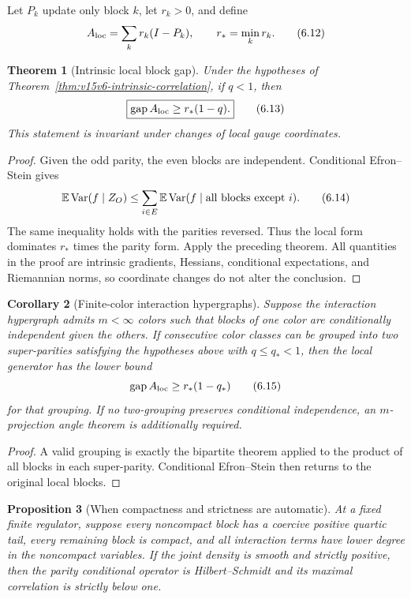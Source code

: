 \documentclass[11pt]{article}
\newtheorem{theorem}{Theorem}[section]
\newtheorem{proposition}[theorem]{Proposition}
\newtheorem{corollary}[theorem]{Corollary}
\theoremstyle{remark}
\begin{document}
Let \(P_k\) update only block \(k\), let \(r_k>0\), and define
\[
 A_{\rm loc}=\sum_kr_k(I-P_k),\qquad r_*=\min_kr_k.            \tag{6.12}
\]

\begin{theorem}[Intrinsic local block gap]
\label{thm:v15v6-local-block-gap}
Under the hypotheses of
Theorem~\ref{thm:v15v6-intrinsic-correlation}, if \(q<1\), then
\[
 \boxed{\operatorname{gap}A_{\rm loc}\ge r_*(1-q).}          \tag{6.13}
\]
This statement is invariant under changes of local gauge
coordinates.
\end{theorem}

\begin{proof}
Given the odd parity, the even blocks are independent.  Conditional
Efron--Stein gives
\[
 \mathbb E\operatorname{Var}(f\mid Z_O)
 \le\sum_{i\in E}
 \mathbb E\operatorname{Var}
 (f\mid\hbox{all blocks except }i).                          \tag{6.14}
\]
The same inequality holds with the parities reversed.  Thus the
local form dominates \(r_*\) times the parity form.  Apply the
preceding theorem.  All quantities in the proof are intrinsic
gradients, Hessians, conditional expectations, and Riemannian
norms, so coordinate changes do not alter the conclusion.
\end{proof}

\begin{corollary}[Finite-color interaction hypergraphs]
\label{cor:v15v6-color}
Suppose the interaction hypergraph admits \(m<\infty\) colors such
that blocks of one color are conditionally independent given the
others.  If consecutive color classes can be grouped into two
super-parities satisfying the hypotheses above with
\(q\le q_*<1\), then the local generator has the lower bound
\[
 \operatorname{gap}A_{\rm loc}
 \ge r_*(1-q_*)                                              \tag{6.15}
\]
for that grouping.  If no two-grouping preserves conditional
independence, an \(m\)-projection angle theorem is additionally
required.
\end{corollary}

\begin{proof}
A valid grouping is exactly the bipartite theorem applied to the
product of all blocks in each super-parity.  Conditional
Efron--Stein then returns to the original local blocks.
\end{proof}

\begin{proposition}[When compactness and strictness are automatic]
\label{prop:v15v6-compactness}
At a fixed finite regulator, suppose every noncompact block has a
coercive positive quartic tail, every remaining block is compact,
and all interaction terms have lower degree in the noncompact
variables.  If the joint density is smooth and strictly positive,
then the parity conditional operator is Hilbert--Schmidt and its
maximal correlation is strictly below one.
\end{proposition}
\end{document}
